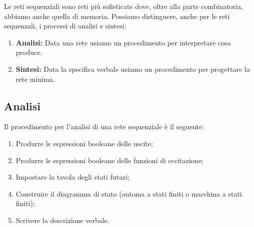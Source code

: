 Le reti sequenziali sono reti più sofisticate dove, oltre alla parte combinatoria, abbiamo anche quella di memoria.
Possiamo distinguere, anche per le reti sequenzali, i processi di analisi e sintesi:
\begin{enumerate}
    \item[a)] \textbf{Analisi:} Data una rete usiamo un procedimento per interpretare cosa produce.
    \item[b)] \textbf{Sintesi:} Data la specifica verbale usiamo un procedimento per progettare la rete minima.
\end{enumerate}

\subsection*{Analisi}
Il procedimento per l'analisi di una rete sequenziale è il seguente:
\begin{enumerate}
    \item\label{rs_ana_1} Produrre le espressioni booleane delle uscite;
    \item\label{rs_ana_2} Produrre le espressioni booleane delle funzioni di eccitazione;
    \item\label{rs_ana_3} Impostare la tavola degli stati futuri;
    \item\label{rs_ana_4} Construire il diagramma di stato (automa a stati finiti o macchina a stati finiti);
    \item\label{rs_ana_5} Scrivere la descrizione verbale.
\end{enumerate}

